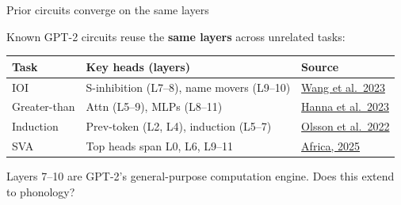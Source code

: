 \documentclass[10pt,aspectratio=169]{beamer}
\begin{document}
\begin{frame}{Prior circuits converge on the same layers}
\hypertarget{sl:backbone}{}

Known GPT-2 circuits reuse the \textbf{same layers} across unrelated tasks:

\vspace{0.2em}
\begin{center}
\scriptsize
\renewcommand{\arraystretch}{1.1}
\begin{tabular}{lll}
\toprule
\textbf{Task} & \textbf{Key heads (layers)} & \textbf{Source} \\
\midrule
IOI & S-inhibition (L7--8), name movers (L9--10) & \href{https://arxiv.org/abs/2211.00593}{Wang et al.\ 2023} \\
Greater-than & Attn (L5--9), MLPs (L8--11) & \href{https://arxiv.org/abs/2305.00586}{Hanna et al.\ 2023} \\
Induction & Prev-token (L2, L4), induction (L5--7) & \href{https://arxiv.org/abs/2209.11895}{Olsson et al.\ 2022} \\
SVA & Top heads span L0, L6, L9--11 & \href{https://arxiv.org/abs/2506.22105}{Africa, 2025} \\
\bottomrule
\end{tabular}
\end{center}

\vspace{0.3em}
\begin{center}
\end{center}

\vspace{0.4em}
Layers 7--10 are GPT-2's general-purpose computation engine. Does this extend to phonology?
\end{frame}
\end{document}
